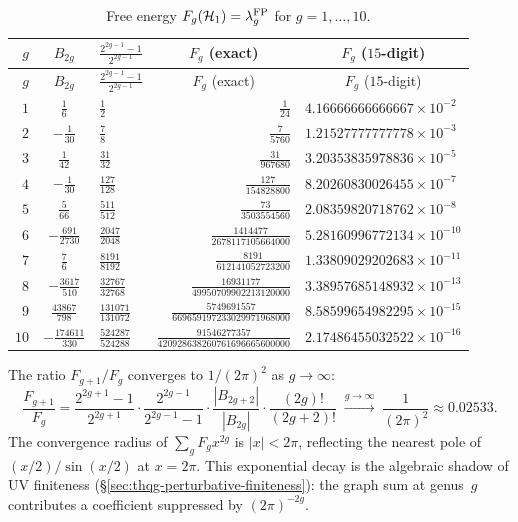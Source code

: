 \begin{center}
\renewcommand{\arraystretch}{1.4}
\begin{longtable}{rclrl}
\caption{Free energy $F_g(\mathcal{H}_1) =
\lambda_g^{\mathrm{FP}}$ for $g = 1, \ldots, 10$.}
\label{tab:thqg-VII-extended-table}\\
$g$ & $B_{2g}$ & $\frac{2^{2g-1}-1}{2^{2g-1}}$
& \multicolumn{1}{c}{$F_g$ (exact)}
& \multicolumn{1}{c}{$F_g$ ($15$-digit)} \\
\hline
\endfirsthead
$g$ & $B_{2g}$ & $\frac{2^{2g-1}-1}{2^{2g-1}}$
& \multicolumn{1}{c}{$F_g$ (exact)}
& \multicolumn{1}{c}{$F_g$ ($15$-digit)} \\
\hline
\endhead
$1$
 & $\frac{1}{6}$
 & $\frac{1}{2}$
 & $\frac{1}{24}$
 & $4.16666666666667 \times 10^{-2}$ \\[4pt]
$2$
 & $-\frac{1}{30}$
 & $\frac{7}{8}$
 & $\frac{7}{5760}$
 & $1.21527777777778 \times 10^{-3}$ \\[4pt]
$3$
 & $\frac{1}{42}$
 & $\frac{31}{32}$
 & $\frac{31}{967680}$
 & $3.20353835978836 \times 10^{-5}$ \\[4pt]
$4$
 & $-\frac{1}{30}$
 & $\frac{127}{128}$
 & $\frac{127}{154828800}$
 & $8.20260830026455 \times 10^{-7}$ \\[4pt]
$5$
 & $\frac{5}{66}$
 & $\frac{511}{512}$
 & $\frac{73}{3503554560}$
 & $2.08359820718762 \times 10^{-8}$ \\[4pt]
$6$
 & $-\frac{691}{2730}$
 & $\frac{2047}{2048}$
 & $\frac{1414477}{2678117105664000}$
 & $5.28160996772134 \times 10^{-10}$ \\[4pt]
$7$
 & $\frac{7}{6}$
 & $\frac{8191}{8192}$
 & $\frac{8191}{612141052723200}$
 & $1.33809029202683 \times 10^{-11}$ \\[4pt]
$8$
 & $-\frac{3617}{510}$
 & $\frac{32767}{32768}$
 & $\frac{16931177}{49950709902213120000}$
 & $3.38957685148932 \times 10^{-13}$ \\[4pt]
$9$
 & $\frac{43867}{798}$
 & $\frac{131071}{131072}$
 & $\frac{5749691557}{669659197233029971968000}$
 & $8.58599654982295 \times 10^{-15}$ \\[4pt]
$10$
 & $-\frac{174611}{330}$
 & $\frac{524287}{524288}$
 & $\frac{91546277357}{420928638260761696665600000}$
 & $2.17486455032522 \times 10^{-16}$
\end{longtable}
\end{center}

\begin{remark}
The ratio $F_{g+1}/F_g$ converges to $1/(2\pi)^2$ as
$g \to \infty$:
\[
\frac{F_{g+1}}{F_g}
= \frac{2^{2g+1}-1}{2^{2g+1}} \cdot
\frac{2^{2g-1}}{2^{2g-1}-1} \cdot
\frac{|B_{2g+2}|}{|B_{2g}|} \cdot
\frac{(2g)!}{(2g+2)!}
\;\xrightarrow{g \to \infty}\;
\frac{1}{(2\pi)^2}
\approx 0.02533.
\]
The convergence radius of $\sum_g F_g x^{2g}$ is
$|x| < 2\pi$, reflecting the nearest pole of
$(x/2)/\sin(x/2)$ at $x = 2\pi$. This exponential
decay is the algebraic shadow of UV finiteness
(\S\ref{sec:thqg-perturbative-finiteness}): the graph
sum at genus~$g$ contributes a coefficient suppressed
by $(2\pi)^{-2g}$.
\end{remark}


